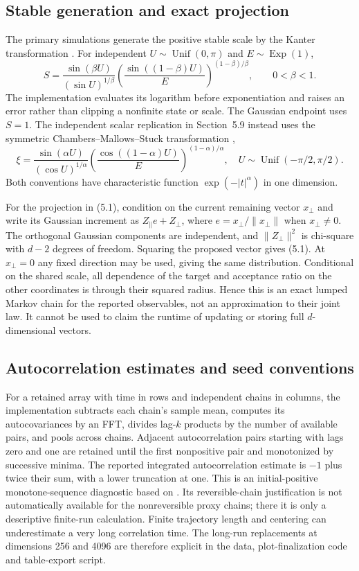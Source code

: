 \documentclass[11pt]{article}
\theoremstyle{definition}\newtheorem{definition}[theorem]{Definition}
\theoremstyle{remark}\newtheorem{remark}[theorem]{Remark}
\numberwithin{equation}{section}
\newcommand{\1}{\mathbf 1}
\begin{document}
\subsection{Stable generation and exact projection}
The primary simulations generate the positive stable scale by the Kanter transformation \citep{kanter}. For independent $U\sim\operatorname{Unif}(0,\pi)$ and $E\sim\operatorname{Exp}(1)$,
\begin{equation}
S=\frac{\sin(\beta U)}{(\sin U)^{1/\beta}}
\left(\frac{\sin((1-\beta)U)}{E}\right)^{(1-\beta)/\beta},
\qquad 0<\beta<1.
\end{equation}
The implementation evaluates its logarithm before exponentiation and raises an error rather than clipping a nonfinite state or scale. The Gaussian endpoint uses $S=1$. The independent scalar replication in Section~5.9 instead uses the symmetric Chambers--Mallows--Stuck transformation \citep{cms},
\begin{equation}
\xi=\frac{\sin(\alpha U)}{(\cos U)^{1/\alpha}}
\left(\frac{\cos((1-\alpha)U)}{E}\right)^{(1-\alpha)/\alpha},
\quad U\sim\operatorname{Unif}(-\pi/2,\pi/2).
\end{equation}
Both conventions have characteristic function $\exp(-|t|^\alpha)$ in one dimension.

For the projection in (5.1), condition on the current remaining vector $x_\perp$ and write its Gaussian increment as $Z_\parallel e+Z_\perp$, where $e=x_\perp/\|x_\perp\|$ when $x_\perp\ne0$. The orthogonal Gaussian components are independent, and $\|Z_\perp\|^2$ is chi-square with $d-2$ degrees of freedom. Squaring the proposed vector gives (5.1). At $x_\perp=0$ any fixed direction may be used, giving the same distribution. Conditional on the shared scale, all dependence of the target and acceptance ratio on the other coordinates is through their squared radius. Hence this is an exact lumped Markov chain for the reported observables, not an approximation to their joint law. It cannot be used to claim the runtime of updating or storing full $d$-dimensional vectors.

\subsection{Autocorrelation estimates and seed conventions}
For a retained array with time in rows and independent chains in columns, the implementation subtracts each chain's sample mean, computes its autocovariances by an FFT, divides lag-$k$ products by the number of available pairs, and pools across chains. Adjacent autocorrelation pairs starting with lags zero and one are retained until the first nonpositive pair and monotonized by successive minima. The reported integrated autocorrelation estimate is $-1$ plus twice their sum, with a lower truncation at one. This is an initial-positive monotone-sequence diagnostic based on \citet{geyer}. Its reversible-chain justification is not automatically available for the nonreversible proxy chains; there it is only a descriptive finite-run calculation. Finite trajectory length and centering can underestimate a very long correlation time. The long-run replacements at dimensions 256 and 4096 are therefore explicit in the data, plot-finalization code and table-export script.
\end{document}
